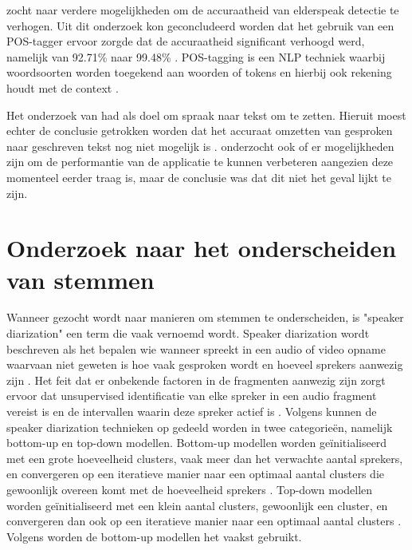 \textcite{Branden2024} zocht naar verdere mogelijkheden om de accuraatheid van elderspeak detectie te verhogen. Uit dit onderzoek kon geconcludeerd worden dat het gebruik van een POS-tagger ervoor zorgde dat de accuraatheid significant verhoogd werd, namelijk van 92.71\% naar 99.48\% \autocite{Branden2024}. POS-tagging is een NLP techniek waarbij woordsoorten worden toegekend aan woorden of tokens en hierbij ook rekening houdt met de context \autocite{Branden2024}.

Het onderzoek van \textcite{Schryver2024} had als doel om spraak naar tekst om te zetten. Hieruit moest echter de conclusie getrokken worden dat het accuraat omzetten van gesproken naar geschreven tekst nog niet mogelijk is \autocite{Schryver2024}. \textcite{Schryver2024} onderzocht ook of er mogelijkheden zijn om de performantie van de applicatie te kunnen verbeteren aangezien deze momenteel eerder traag is, maar de conclusie was dat dit niet het geval lijkt te zijn.

\section{Onderzoek naar het onderscheiden van stemmen}
Wanneer gezocht wordt naar manieren om stemmen te onderscheiden, is "speaker diarization" een term die vaak vernoemd wordt. Speaker diarization wordt beschreven als het bepalen wie wanneer spreekt in een audio of video opname waarvaan niet geweten is hoe vaak gesproken wordt en hoeveel sprekers aanwezig zijn \autocite{AngueraMiro2012}. Het feit dat er onbekende factoren in de fragmenten aanwezig zijn zorgt ervoor dat unsupervised identificatie van elke spreker in een audio fragment vereist is en de intervallen waarin deze spreker actief is \autocite{AngueraMiro2012}. Volgens \textcite{AngueraMiro2012} kunnen de speaker diarization technieken op gedeeld worden in twee categorieën, namelijk bottom-up en top-down modellen. Bottom-up modellen worden geïnitialiseerd met een grote hoeveelheid clusters, vaak meer dan het verwachte aantal sprekers, en convergeren op een iteratieve manier naar een optimaal aantal clusters die gewoonlijk overeen komt met de hoeveelheid sprekers \autocite{AngueraMiro2012}. Top-down modellen worden geïnitialiseerd met een klein aantal clusters, gewoonlijk een cluster, en convergeren dan ook op een iteratieve manier naar een optimaal aantal clusters \autocite{AngueraMiro2012}. Volgens \textcite{AngueraMiro2012} worden de bottom-up modellen het vaakst gebruikt.

